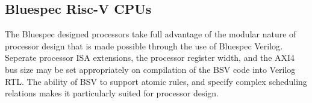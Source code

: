 \documentclass[a4paper,8pt]{report}
\begin{document}






\subsection{Bluespec Risc-V CPUs}
The Bluespec designed processors take full advantage of the modular nature of
processor design that is made possible through the use of Bluespec Verilog\cite{bluespec}.
Seperate processor ISA extensions, the processor register width, and the AXI4
bus size may be set appropriately on compilation of the BSV code into Verilog
RTL. The ability of BSV to support atomic rules, and specify complex scheduling
relations makes it particularly suited for processor design.
\end{document}
